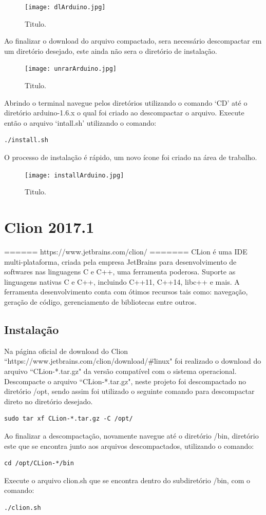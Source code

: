 \documentclass[a4paper,12pt,portuguese]{ufms-cpcx}
\begin{document}
\begin{figure}[H]	
	\centering
	\texttt{[image: dlArduino.jpg]}
	\caption{Titulo.}
\end{figure}
Ao finalizar o download do arquivo compactado, sera necessário descompactar em um diretório desejado, este ainda não sera o diretório de instalação. 
\begin{figure}[H]	
	\centering
	\texttt{[image: unrarArduino.jpg]}
	\caption{Titulo.}
\end{figure}
Abrindo o terminal navegue pelos diretórios utilizando o comando ‘CD’ até o diretório arduino-1.6.x o qual foi criado ao descompactar o arquivo. Execute então o arquivo ‘intall.sh’ utilizando o comando: 
\begin{lstlisting}
./install.sh
\end{lstlisting}
O processo de instalação é rápido, um novo ícone foi criado na área de trabalho.
\begin{figure}[H]	
	\centering
	\texttt{[image: installArduino.jpg]}
	\caption{Titulo.}
\end{figure}

\section{Clion 2017.1}
====== https://www.jetbrains.com/clion/ =======
CLion é uma IDE multi-plataforma, criada pela empresa JetBrains para desenvolvimento de softwares nas linguagens C e C++, uma ferramenta poderosa. Suporte as linguagens nativas C e C++, incluindo C++11, C++14, libc++ e mais. A ferramenta desenvolvimento conta com ótimos recursos tais como: navegação, geração de código, gerenciamento de bibliotecas entre outros.
\subsection{Instalação}
Na página oficial de download do Clion ``https://www.jetbrains.com/clion/download/\#\=linux" foi realizado o download do arquivo ``CLion-*.tar.gz" da versão compatível com o sistema operacional. Descompacte o arquivo ``CLion-*.tar.gz", neste projeto foi descompactado no diretório /opt, sendo assim foi utilizado o seguinte comando para descompactar direto no diretório desejado.
\begin{lstlisting}
sudo tar xf CLion-*.tar.gz -C /opt/
\end{lstlisting}
Ao finalizar a descompactação, novamente navegue até o diretório /bin, diretório este que se encontra junto aos arquivos descompactados, utilizando o comando: 
\begin{lstlisting}
cd /opt/CLion-*/bin
\end{lstlisting}
Execute o arquivo clion.sh que se encontra dentro do subdiretório /bin, com o comando:
\begin{lstlisting}
./clion.sh
\end{lstlisting}
\end{document}
